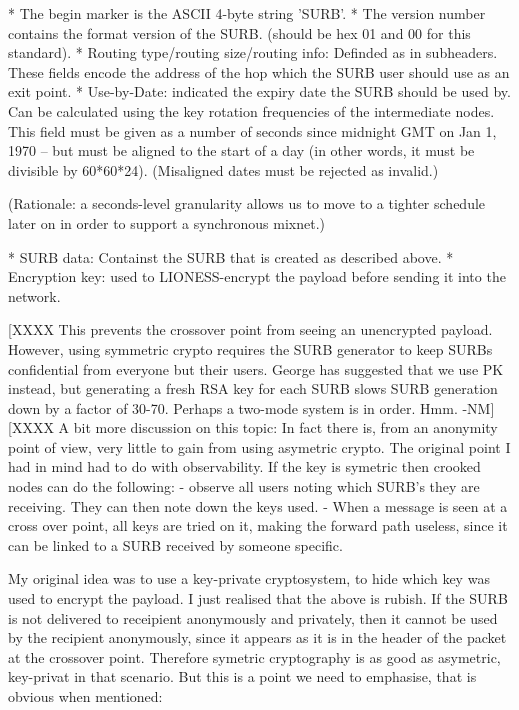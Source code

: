 * The begin marker is the ASCII 4-byte string 'SURB'. 
* The version number contains the format version of the SURB.
  (should be hex 01 and 00 for this standard).
* Routing type/routing size/routing info: Definded as in subheaders.  
  These fields encode the address of the hop which the SURB user should
  use as an exit point.
* Use-by-Date: indicated the expiry date the SURB should be used by. Can
  be calculated using the key rotation frequencies of the intermediate
  nodes.  This field must be given as a number of seconds since
  midnight GMT on Jan 1, 1970 -- but must be aligned to the start of a
  day (in other words, it must be divisible by 60*60*24).
  (Misaligned dates must be rejected as invalid.)

  (Rationale: a seconds-level granularity allows us to move to a
  tighter schedule later on in order to support a synchronous mixnet.)

* SURB data: Containst the SURB that is created as described
  above. 
* Encryption key: used to LIONESS-encrypt the payload before sending it
  into the network.  

  [XXXX This prevents the crossover point from seeing an
    unencrypted payload.  However, using symmetric crypto requires the
    SURB generator to keep SURBs confidential from everyone but their
    users.  George has suggested that we use PK instead, but generating
    a fresh RSA key for each SURB slows SURB generation down by a factor
    of 30-70.   Perhaps a two-mode system is in order.  Hmm. -NM]
  [XXXX A bit more discussion on this topic: In fact there is, from an
    anonymity point of view, very little to gain from using asymetric
    crypto. The original point I had in mind had to do with
    observability. If the key is symetric then crooked nodes can do
    the following:
	- observe all users noting which SURB's they are receiving.
	  They can then note down the keys used.
	- When a message is seen at a cross over point, all keys are
    	  tried on it, making the forward path useless, since it can
          be linked to a SURB received by someone specific.

    My original idea was to use a key-private cryptosystem, to hide
    which key was used to encrypt the payload.
    I just realised that the above is rubish. If the SURB is not
    delivered to receipient anonymously and privately, then it cannot
    be used by the recipient anonymously, since it appears as it is in
    the header of the packet at the crossover point. Therefore
    symetric cryptography is as good as asymetric, key-privat in that
    scenario. But this is a point we need to emphasise, that is
    obvious when mentioned:

